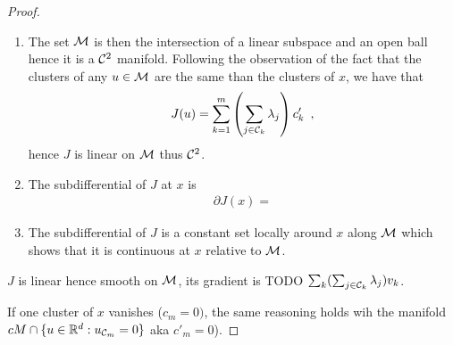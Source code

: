 \begin{proof}
  

\begin{enumerate}
  \item The set $\mathcal{M}$ is then the intersection of a linear subspace and an open ball hence it is a $\mathcal{C}^2$ manifold. 
  Following the observation of the fact that the clusters of any $u\in\mathcal{M}$ are the same than the clusters of $x$, we have that 
  \begin{align}{}
    J(u) = \sum_{k=1}^m \left( \sum_{j \in \mathcal{C}_k} \lambda_j \right)c_k' \enspace ,
  \end{align}
  hence $J$ is linear on $\mathcal{M}$ thus $\mathcal{C}^2$. 
  \item The subdifferential of $J$ at $x$ is 
  \begin{align}
    \partial J(x) = 
  \end{align}
  \item The subdifferential of $J$ is a constant set locally around $x$ along $\mathcal{M}$ which shows that it is continuous at $x$ relative to $\mathcal{M}$. 
\end{enumerate}






  $J$ is linear hence smooth on $\mathcal{M}$, its gradient is TODO $\sum_k (\sum_{j \in \mathcal{C}_k} \lambda_j) v_k$. 

  If one cluster of $x$ vanishes ($c_m = 0)$, the same reasoning holds wih the manifold $cM \cap \{u \in \mathbb{R}^d: u_{\mathcal{C}_m} = 0\}$ aka $c'_m = 0$).
\end{proof}
